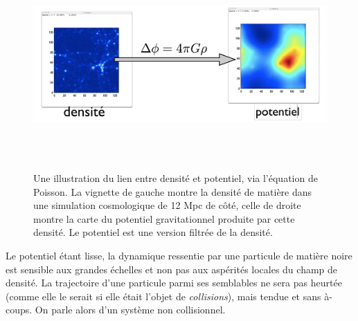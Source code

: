 \begin{figure}[htbp]
	\centering
		\includegraphics[height=8cm]{figs/poisson.png}
	\caption[Une illustration du lien entre densité et potentiel, via l'équation de Poisson.]{Une illustration du lien entre densité et potentiel, via l'équation de Poisson. La vignette de gauche montre la densité de matière dans une simulation cosmologique de 12 Mpc de côté, celle de droite montre la carte du potentiel gravitationnel produite par cette densité. Le potentiel est une version filtrée de la densité.} 
	\label{f:poisson}
\end{figure}

Le potentiel étant lisse, la dynamique ressentie par une particule de matière noire est sensible aux grandes échelles et non pas aux aspérités locales du champ de densité. La trajectoire d'une particule parmi ses semblables ne sera pas heurtée (comme elle le serait si elle était l'objet de \textit{collisions}), mais tendue et sans à-coups. On parle alors d’un système non collisionnel.

